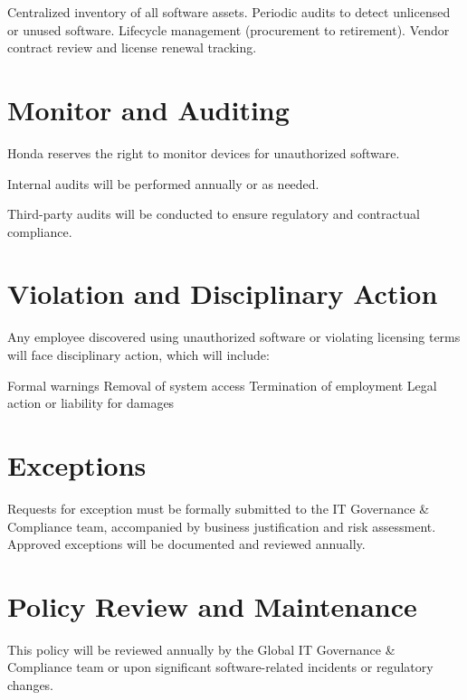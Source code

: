     Centralized inventory of all software assets.
    Periodic audits to detect unlicensed or unused software.
    Lifecycle management (procurement to retirement).
    Vendor contract review and license renewal tracking.
    
\section{Monitor and Auditing}

Honda reserves the right to monitor devices for unauthorized software.

Internal audits will be performed annually or as needed.

Third-party audits will be conducted to ensure regulatory and contractual compliance.

\section{Violation and Disciplinary Action}

Any employee discovered using unauthorized software or violating licensing terms will face disciplinary action, which will include:
    
    Formal warnings
    Removal of system access
    Termination of employment
    Legal action or liability for damages

\section{Exceptions}

Requests for exception must be formally submitted to the IT Governance & Compliance team, accompanied by business justification and risk assessment. Approved exceptions will be documented and reviewed annually.

\section{Policy Review and Maintenance}

This policy will be reviewed annually by the Global IT Governance & Compliance team or upon significant software-related incidents or regulatory changes.